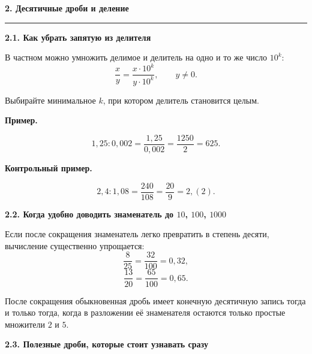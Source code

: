 \documentclass[a4paper,12pt]{article}
\newcommand{\topic}[1]{%
  \vspace{0.3em}
  {\Large\bfseries\textcolor{darkaccent}{#1}}\par
  \vspace{0.3em}
  \noindent\textcolor{accent}{\rule{\linewidth}{0.7pt}}\par
  \vspace{0.5em}
}
\newcommand{\subtopic}[1]{%
  \vspace{0.6em}
  {\large\bfseries\textcolor{darkaccent}{#1}}\par
  \vspace{0.15em}
}
\newcommand{\important}[1]{%
  \textbf{\textcolor{darkaccent}{#1}}%
}
\begin{document}
\begin{center}
\end{center}

\clearpage


\topic{2. Десятичные дроби и деление}

\subtopic{2.1. Как убрать запятую из делителя}

В частном можно умножить делимое и делитель
на одно и то же число \(10^k\):
\[
\frac{x}{y}
=
\frac{x\cdot10^k}{y\cdot10^k},
\qquad
y\ne0.
\]

Выбирайте минимальное \(k\), при котором делитель становится целым.

\important{Пример.}
\[
1{,}25:0{,}002
=
\frac{1{,}25}{0{,}002}
=
\frac{1250}{2}
=
625.
\]

\important{Контрольный пример.}
\[
2{,}4:1{,}08
=
\frac{240}{108}
=
\frac{20}{9}
=
2{,}(2).
\]

\subtopic{2.2. Когда удобно доводить знаменатель до \(10\), \(100\), \(1000\)}

Если после сокращения знаменатель легко превратить
в степень десяти, вычисление существенно упрощается:
\[
\frac{8}{25}
=
\frac{32}{100}
=
0{,}32,
\]
\[
\frac{13}{20}
=
\frac{65}{100}
=
0{,}65.
\]

После сокращения обыкновенная дробь имеет конечную десятичную запись
тогда и только тогда, когда в разложении её знаменателя остаются
только простые множители \(2\) и \(5\).

\subtopic{2.3. Полезные дроби, которые стоит узнавать сразу}
\end{document}
